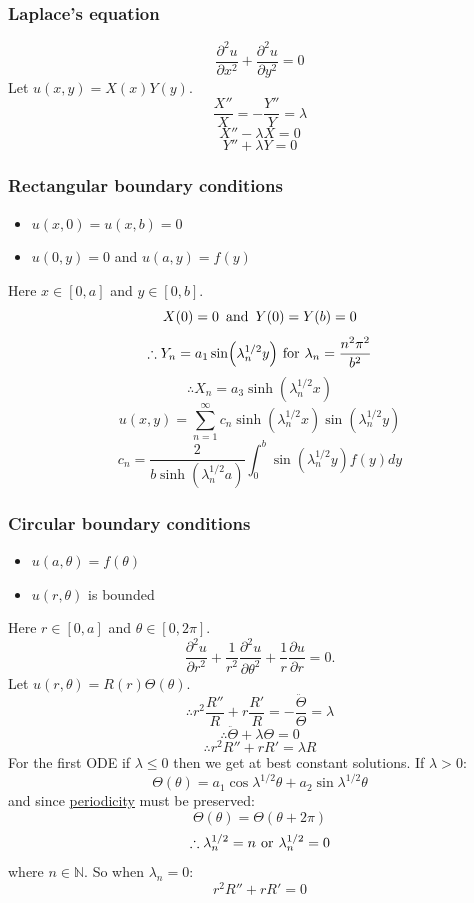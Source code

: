 \documentclass{article}
\begin{document}
\begin{multicols}{3}
\subsubsection*{Laplace's equation}
$$\frac{\partial^2 u}{\partial x^2}+\frac{\partial^2 u}{\partial y^2}=0$$
Let $u(x,y)=X(x)Y(y)$.
$$\frac{X''}{X}=-\frac{Y''}{Y}=\lambda$$
$$X''-\lambda X=0$$
$$Y''+\lambda Y=0$$

\subsubsection*{Rectangular boundary conditions}
\begin{itemize}
    \item $u(x,0)=u(x,b)=0$

    \item $u(0,y)=0$ and $u(a,y)=f(y)$
\end{itemize}
Here $x\in[0,a]$ and $y\in[0,b]$.
$$X(0)=0\hspace{0.07in}\text{and}\hspace{0.07in}Y(0)=Y(b)=0$$
$$\therefore Y_n=a_1\sin(\lambda_n^{1/2} y)\hspace{0.05in}
\text{for}\hspace{0.05in}\lambda_n=\frac{n^2\pi^2}{b^2}$$
$$\therefore X_n=a_3\sinh(\lambda_n^{1/2} x)$$
$$u(x,y)=\sum_{n=1}^{\infty}c_n\sinh(\lambda_n^{1/2} x)
\sin(\lambda_n^{1/2} y)$$
$$c_n=\frac{2}{b\sinh(\lambda_n^{1/2} a)}
\int_{0}^{b}\sin(\lambda_n^{1/2} y)f(y)dy$$

\subsubsection*{Circular boundary conditions}
\begin{itemize}
    \item $u(a,\theta)=f(\theta)$
    \item $u(r,\theta)$ is bounded
\end{itemize}
Here $r\in[0,a]$ and $\theta\in[0,2\pi]$.
$$\frac{\partial^2 u}{\partial r^2}+\frac{1}{r^2}\frac{\partial^2 u}{\partial\theta^2}
+\frac{1}{r}\frac{\partial u}{\partial r}=0.$$
Let $u(r,\theta)=R(r)\Theta(\theta)$.
$$\therefore r^2\frac{R''}{R}+r\frac{R'}{R}=-\frac{\ddot{\Theta}}{\Theta}=\lambda$$
$$\therefore\ddot{\Theta}+\lambda\Theta=0$$
$$\therefore r^2 R''+rR'=\lambda R$$
For the first ODE if $\lambda\leq0$ then we get
at best constant solutions. If $\lambda>0$:
$$\Theta(\theta)=a_1\cos\lambda^{1/2}\theta
+a_2\sin\lambda^{1/2}\theta$$
and since \underline{periodicity} must be preserved:
$$\Theta(\theta)=\Theta(\theta+2\pi)$$
$$\therefore\lambda_n^{1/2}=n
\hspace{0.05in}\text{or}\hspace{0.05in}
\lambda_n^{1/2}=0$$
where $n\in\mathbb{N}$. So when $\lambda_n=0$:
$$r^2 R''+rR'=0$$


\end{multicols}
\end{document}
